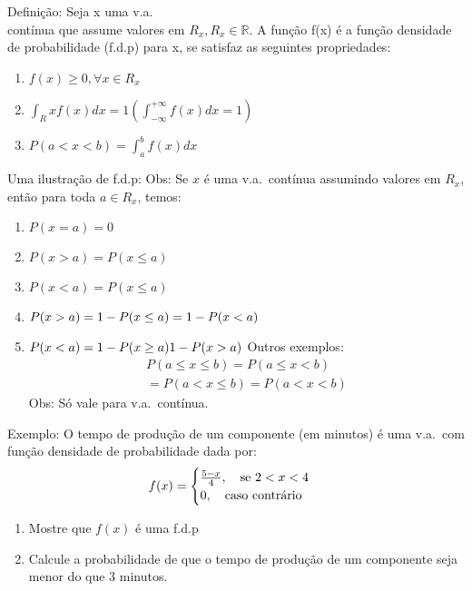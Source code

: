 \documentclass[11pt,a4paper]{article}
\begin{document}
Definição: Seja x uma v.a.\\ contínua que assume valores em $R_{x},R_{x} \in \mathbb{R}$.
A função f(x) é a função densidade de probabilidade (f.d.p) para x, se satisfaz as 
seguintes propriedades: 
\begin{enumerate} %
  \item $f(x)\geq 0, \forall x \in R_{x}$
  \item $\int_R{x} f(x) dx=1 (\int_{- \infty}^{+ \infty} f(x)dx=1)$
  \item $P(a<x<b)=\int^b_a f(x) dx $
\end{enumerate}
Uma ilustração de f.d.p: 
Obs: Se $x$ é uma v.a.\ contínua assumindo valores em $R_{x}$, então para toda 
$a \in R_{x}$, temos: 
\begin{enumerate}[label=(\alph*)]
  \item $P(x=a)=0$
  \item $P(x>a)=P(x\leq a)$
  \item $P(x<a)=P(x\le a)$
  \item $P(x>a)=1- P(x \le a)\\ = 1-P(x<a)$
  \item $P(x<a)=1-P(x \geq a)\\ 1-P(x>a)$
    Outros exemplos: 
    \begin{align}
      P(a\le x \le b)= P(a\le x < b)\\
      = P(a<x \le b)= P(a<x<b)
    \end{align}
    Obs: Só vale para v.a.\ contínua. 
\end{enumerate}
Exemplo: 
O tempo de produção de um componente (em minutos) é uma v.a.\ com função densidade 
de probabilidade dada por: 
\begin{align}
  f(x)=
  \begin{cases}
    \frac{5-x}{4}, \text{\quad se $2<x<4$}\\
    0,\text{\quad caso contrário} 
  \end{cases}
\end{align}
\begin{enumerate}[label=(\alph*)]
  \item Mostre que $f(x)$ é uma f.d.p
  \item Calcule a probabilidade de que o tempo de produção de um componente 
    seja menor do que 3 minutos.
\end{enumerate}
\end{document}
